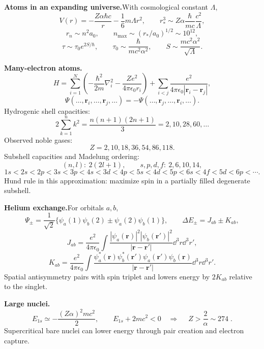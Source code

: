 \noindent\textbf{Atoms in an expanding universe.}\quad With cosmological constant
$\Lambda$,
\[
V(r)=-\frac{Z\alpha\hbar c}{r}-\frac16m\Lambda r^2,\qquad
r_*^3\sim Z\alpha\frac{\hbar}{mc}\frac{c^2}{\Lambda},
\]
\[
r_n\sim n^2a_0,\qquad n_{\max}\sim(r_*/a_0)^{1/2}\sim10^{12},
\]
\[
\tau\sim\tau_0e^{2S/\hbar},\qquad
\tau_0\sim\frac{\hbar}{mc^2\alpha^2},\qquad
S\sim\frac{mc^2\alpha^2}{\sqrt{\Lambda}}.
\]

\noindent\textbf{Many-electron atoms.}\quad
\[
H=\sum_{i=1}^N\left(-\frac{\hbar^2}{2m}\nabla_i^2
-\frac{Ze^2}{4\pi\epsilon_0r_i}\right)
+\sum_{i<j}\frac{e^2}{4\pi\epsilon_0|\mathbf r_i-\mathbf r_j|},
\]
\[
\Psi(\ldots,\mathbf r_i,\ldots,\mathbf r_j,\ldots)
=-\Psi(\ldots,\mathbf r_j,\ldots,\mathbf r_i,\ldots).
\]
Hydrogenic shell capacities:
\[
2\sum_{k=1}^n k^2=\frac{n(n+1)(2n+1)}{3}=2,10,28,60,\ldots
\]
Observed noble gases:
\[
Z=2,10,18,36,54,86,118.
\]
Subshell capacities and Madelung ordering:
\[
(n,l):\ 2(2l+1),\qquad s,p,d,f:\ 2,6,10,14,
\]
\[
1s<2s<2p<3s<3p<4s<3d<4p<5s<4d<5p<6s<4f<5d<6p<\cdots .
\]
Hund rule in this approximation: maximize spin in a partially filled degenerate subshell.

\noindent\textbf{Helium exchange.}\quad For orbitals $a,b$,
\[
\Psi_\pm=\frac1{\sqrt2}\{\psi_a(1)\psi_b(2)\pm\psi_a(2)\psi_b(1)\},
\qquad
\Delta E_\pm=J_{ab}\pm K_{ab},
\]
\[
J_{ab}=\frac{e^2}{4\pi\epsilon_0}
\int\frac{|\psi_a(\mathbf r)|^2|\psi_b(\mathbf r')|^2}
{|\mathbf r-\mathbf r'|}\dd^3r\dd^3r',
\]
\[
K_{ab}=\frac{e^2}{4\pi\epsilon_0}
\int\frac{\psi_a^*(\mathbf r)\psi_b^*(\mathbf r')
\psi_a(\mathbf r')\psi_b(\mathbf r)}
{|\mathbf r-\mathbf r'|}\dd^3r\dd^3r'.
\]
Spatial antisymmetry pairs with spin triplet and lowers energy by $2K_{ab}$
relative to the singlet.

\noindent\textbf{Large nuclei.}\quad
\[
E_{1s}\simeq-\frac{(Z\alpha)^2mc^2}{2},\qquad
E_{1s}+2mc^2<0
\quad\Longrightarrow\quad
\boxed{\;Z>\frac2{\alpha}\sim274\;}.
\]
Supercritical bare nuclei can lower energy through pair creation and electron capture.

